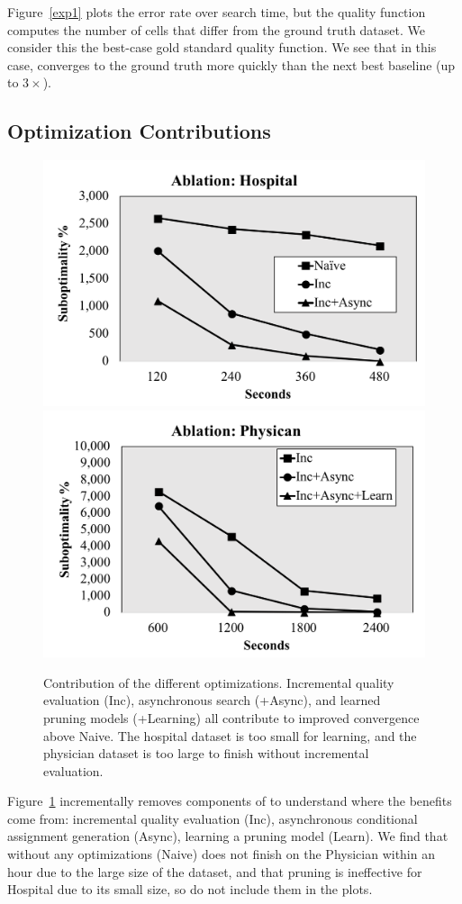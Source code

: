 Figure~\ref{exp1} plots the error rate over search time, but the quality function computes the number of cells that differ from the ground truth dataset.  We consider this the best-case gold standard quality function.
We see that in this case, \sys converges to the ground truth more quickly than the next best baseline (up to $3\times$).


\subsection{Optimization Contributions}

\begin{figure}[t]
\centering
 \includegraphics[width=0.8\columnwidth]{exp/exp7a.png}
 \includegraphics[width=0.8\columnwidth]{exp/exp7b.png}
 \caption{Contribution of the different optimizations. Incremental quality evaluation (Inc), asynchronous search (+Async), and learned pruning models (+Learning) all contribute to improved convergence above Naive. The hospital dataset is too small for learning, and the physician dataset is too large to finish without incremental evaluation. \label{exp7}}
\end{figure}


Figure~\ref{exp7} incrementally removes components of \sys to understand where the benefits come from:  incremental quality evaluation (Inc), asynchronous conditional assignment generation (Async), learning a pruning model (Learn).  We find that \sys without any optimizations (Naive) does not finish on the Physician within an hour due to the large size of the dataset, and that pruning is ineffective for Hospital due to its small size, so do not include them in the plots.

